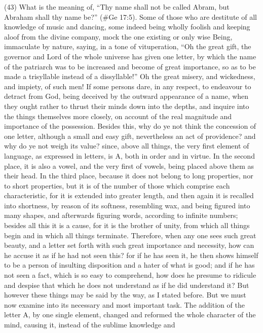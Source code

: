 (43) What is the meaning of, ``Thy name shall not be called Abram, but Abraham shall thy name
be?'' (\#Ge 17:5). Some of those who are destitute of all knowledge of music and dancing,
some indeed being wholly foolish and keeping aloof from the divine company, mock the one
existing or only wise Being, immaculate by nature, saying, in a tone of vituperation, ``Oh the great
gift, the governor and Lord of the whole universe has given one letter, by which the name of the
patriarch was to be increased and become of great importance, so as to be made a trisyllable
instead of a dissyllable!'' Oh the great misery, and wickedness, and impiety, of such men! If some
persons dare, in any respect, to endeavour to detract from God, being deceived by the outward
appearance of a name, when they ought rather to thrust their minds down into the depths, and
inquire into the things themselves more closely, on account of the real magnitude and importance
of the possession. Besides this, why do ye not think the concession of one letter, although a small
and easy gift, nevertheless an act of providence? and why do ye not weigh its value? since, above
all things, the very first element of language, as expressed in letters, is A, both in order and in
virtue. In the second place, it is also a vowel, and the very first of vowels, being placed above them
as their head. In the third place, because it does not belong to long properties, nor to short
properties, but it is of the number of those which comprise each characteristic, for it is extended
into greater length, and then again it is recalled into shortness, by reason of its softness,
resembling wax, and being figured into many shapes, and afterwards figuring words, according to
infinite numbers; besides all this it is a cause, for it is the brother of unity, from which all things
begin and in which all things terminate. Therefore, when any one sees such great beauty, and a
letter set forth with such great importance and necessity, how can he accuse it as if he had not
seen this? for if he has seen it, he then shows himself to be a person of insulting disposition and a
hater of what is good; and if he has not seen a fact, which is so easy to comprehend, how does he
presume to ridicule and despise that which he does not understand as if he did understand it? But
however these things may be said by the way, as I stated before. But we must now examine into its
necessary and most important task. The addition of the letter A, by one single element, changed
and reformed the whole character of the mind, causing it, instead of the sublime knowledge and
